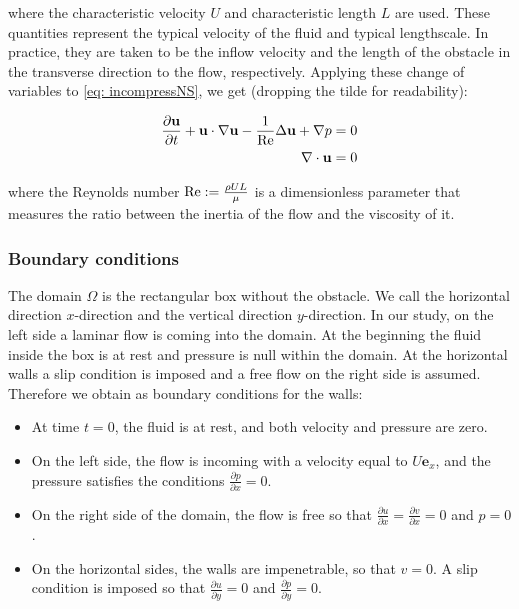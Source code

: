 where the characteristic velocity $U$ and characteristic length $L$ are used. These quantities represent the typical velocity of the fluid and typical lengthscale. In practice, they are taken to be the inflow velocity and the length of the obstacle in the transverse direction to the flow, respectively. Applying these change of variables to \cref{eq: incompressNS}, we get (dropping the tilde for readability):

\begin{align}
  \frac{\partial \textbf{u}}{\partial t} + \textbf{u} \cdot \nabla \textbf{u} - \frac{1}{\text{Re}} \Delta \textbf{u} + \nabla p = 0 \label{eq:Ns_normalized} \\
  \nabla\cdot\boldsymbol{\mathrm{u}} = 0 \notag
\end{align}

where the Reynolds number $\mathrm{Re} := \frac{\rho U L}{\mu}$ is a dimensionless parameter that measures the ratio between the inertia of the flow and the viscosity of it.

\subsubsection*{Boundary conditions}
The domain $\Omega$ is the rectangular box without the obstacle. We call the horizontal direction $x$-direction and the vertical direction $y$-direction. In our study, on the left side a laminar flow is coming into the domain. At the beginning the fluid inside the box is at rest and pressure is null within the domain. At the horizontal walls a slip condition is imposed and a free flow on the right side is assumed. Therefore we obtain as boundary conditions for the walls:

\begin{itemize}
  \item At time $t=0$, the fluid is at rest, and both velocity and pressure are zero.
  \item On the left side, the flow is incoming with a velocity equal to $U \mathbf{e}_x$, and the pressure satisfies the conditions $\frac{\partial p}{\partial x} = 0$.
  \item On the right side of the domain, the flow is free so that $\frac{\partial u}{\partial x} = \frac{\partial v}{\partial x} = 0$ and $p = 0$.
  \item On the horizontal sides, the walls are impenetrable, so that $v = 0$. A slip condition is imposed so that $\frac{\partial u}{\partial y} = 0$ and $\frac{\partial p}{\partial y} = 0$.
\end{itemize}

